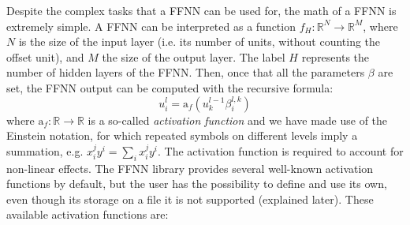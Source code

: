 \documentclass[11pt,a4paper,twoside]{article}
\newcommand{\actf}{\text{a}_f}
\begin{document}
Despite the complex tasks that a FFNN can be used for, the math of a FFNN is extremely simple.
A FFNN can be interpreted as a function $f_H: \mathbb{R}^N \rightarrow \mathbb{R}^M$, where $N$ is the size of the input layer (i.e. its number of units, without counting the offset unit), and $M$ the size of the output layer.
The label $H$ represents the number of hidden layers of the FFNN.
Then, once that all the parameters $\beta$ are set, the FFNN output can be computed with the recursive formula:
\begin{equation}
  u^l_i = \actf( u^{l-1}_{k} \beta^{l,k}_{i}  )
\end{equation}
where $\actf: \mathbb{R} \rightarrow \mathbb{R}$ is a so-called \emph{activation function} and we have made use of the Einstein notation, for which repeated symbols on different levels imply a summation, e.g. $x_i^j y^i = \sum_i x_i^j y^i$.
The activation function is required to account for non-linear effects.
The FFNN library provides several well-known activation functions by default, but the user has the possibility to define and use its own, even though its storage on a file it is not supported (explained later).
These available activation functions are:
\end{document}
